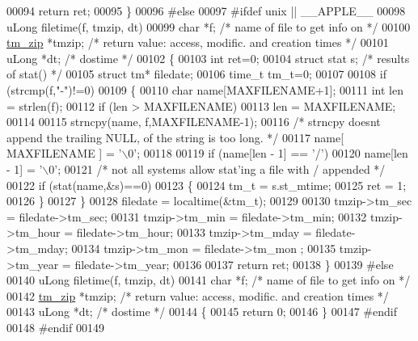 \begin{DoxyCode}
00094   \textcolor{keywordflow}{return} ret;
00095 \}
00096 \textcolor{preprocessor}{#else}
00097 \textcolor{preprocessor}{#ifdef unix || \_\_APPLE\_\_}
00098 uLong filetime(f, tmzip, dt)
00099     \textcolor{keywordtype}{char} *f;               \textcolor{comment}{/* name of file to get info on */}
00100     \hyperlink{structtm__zip__s}{tm\_zip} *tmzip;         \textcolor{comment}{/* return value: access, modific. and creation times */}
00101     uLong *dt;             \textcolor{comment}{/* dostime */}
00102 \{
00103   \textcolor{keywordtype}{int} ret=0;
00104   \textcolor{keyword}{struct }stat s;        \textcolor{comment}{/* results of stat() */}
00105   \textcolor{keyword}{struct }tm* filedate;
00106   time\_t tm\_t=0;
00107 
00108   \textcolor{keywordflow}{if} (strcmp(f,\textcolor{stringliteral}{"-"})!=0)
00109   \{
00110     \textcolor{keywordtype}{char} name[MAXFILENAME+1];
00111     \textcolor{keywordtype}{int} len = strlen(f);
00112     \textcolor{keywordflow}{if} (len > MAXFILENAME)
00113       len = MAXFILENAME;
00114 
00115     strncpy(name, f,MAXFILENAME-1);
00116     \textcolor{comment}{/* strncpy doesnt append the trailing NULL, of the string is too long. */}
00117     name[ MAXFILENAME ] = \textcolor{charliteral}{'\(\backslash\)0'};
00118 
00119     \textcolor{keywordflow}{if} (name[len - 1] == \textcolor{charliteral}{'/'})
00120       name[len - 1] = \textcolor{charliteral}{'\(\backslash\)0'};
00121     \textcolor{comment}{/* not all systems allow stat'ing a file with / appended */}
00122     \textcolor{keywordflow}{if} (stat(name,&s)==0)
00123     \{
00124       tm\_t = s.st\_mtime;
00125       ret = 1;
00126     \}
00127   \}
00128   filedate = localtime(&tm\_t);
00129 
00130   tmzip->tm\_sec  = filedate->tm\_sec;
00131   tmzip->tm\_min  = filedate->tm\_min;
00132   tmzip->tm\_hour = filedate->tm\_hour;
00133   tmzip->tm\_mday = filedate->tm\_mday;
00134   tmzip->tm\_mon  = filedate->tm\_mon ;
00135   tmzip->tm\_year = filedate->tm\_year;
00136 
00137   \textcolor{keywordflow}{return} ret;
00138 \}
00139 \textcolor{preprocessor}{#else}
00140 uLong filetime(f, tmzip, dt)
00141     \textcolor{keywordtype}{char} *f;                \textcolor{comment}{/* name of file to get info on */}
00142     \hyperlink{structtm__zip__s}{tm\_zip} *tmzip;             \textcolor{comment}{/* return value: access, modific. and creation times */}
00143     uLong *dt;             \textcolor{comment}{/* dostime */}
00144 \{
00145     \textcolor{keywordflow}{return} 0;
00146 \}
00147 \textcolor{preprocessor}{#endif}
00148 \textcolor{preprocessor}{#endif}
00149 

\end{DoxyCode}
